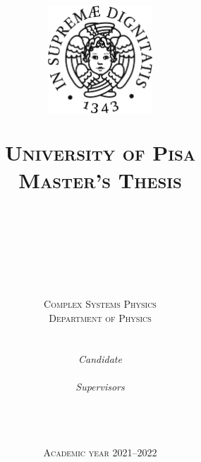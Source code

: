 \title{
  \vspace{-10pt}
  \begin{figure}[h]
    \centering
    \includegraphics[width=0.35\textwidth]{figures/unipi_logo_black.pdf}
  \end{figure}
  \textsc{University of Pisa}\\
  \textsc{Master's Thesis}\\



  \hrulefill \\
  \vspace{8pt}
  \Huge \textbf{\Title} \\
  \hrulefill \\
}


\author{
  \textsc{Complex Systems Physics}\\
  \textsc{Department of Physics}\\
  \vspace{30pt} \\
  \begin{minipage}[h]{0.45\linewidth}
    \begin{flushleft}
      \textit{Candidate} \\
      \textbf{\Luca}
    \end{flushleft}
  \end{minipage}
  \begin{minipage}[h]{0.45\linewidth}
    \begin{flushright}
      \textit{Supervisors} \\
      \textbf{\Florent} \\
      \textbf{\Bruno}
    \end{flushright}
  \end{minipage}
  \vspace{30pt} \\
}
\date{\textsc{Academic year 2021--2022}}
  
